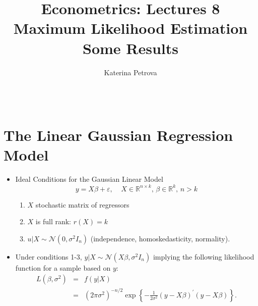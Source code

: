 \documentclass[notes=show]{beamer}
\begin{document}
\title{Econometrics: Lectures 8\\
Maximum Likelihood Estimation Some Results}
\author{Katerina Petrova \ \ \ \ \ \ \ \ \ \ \ \ \ \ \ \ \ \ \ \ \ \ \ \ \ \
\ \ \ \ \ \ \ \ \ \ \ \ \ \ \ \ \ \ \ \ \ \ \ \ \ \ \ \ \ \ \ \ \ \ \ \ \ \
\ \ \ \ \ \ \ \ \ \ \ \ \ \ \ \ \ \ \ \ \ \ \ }
\date{}
\maketitle

\section{The Linear Gaussian Regression Model}

\begin{frame}%



\begin{itemize}
\item Ideal Conditions for the Gaussian Linear Model%
\begin{equation*}
y=X\beta +\varepsilon ,\;\;\;\;X\in \mathbb{R}^{n\times k}\text{, }\beta \in 
\mathbb{R}^{k}\text{, }n>k
\end{equation*}

\begin{enumerate}
\item $X$ stochastic matrix of regressors

\item $X$ is full rank: $r\left( X\right) =k$

\item $u|X\sim \mathcal{N}\left( 0,\sigma ^{2}I_{n}\right) $ (independence,
homoskedasticity, normality).
\end{enumerate}

\item Under conditions 1-3, $y|X\sim \mathcal{N}\left( X\beta ,\sigma
^{2}I_{n}\right) $ implying the following likelihood function for a sample
based on $y$:%
\begin{eqnarray*}
L\left( \beta ,\sigma ^{2}\right) &=&f\left( y|X\right) \\
&=&\left( 2\pi \sigma ^{2}\right) ^{-n/2}\exp \left\{ -\frac{1}{2\sigma ^{2}}%
\left( y-X\beta \right) ^{\prime }\left( y-X\beta \right) \right\} .
\end{eqnarray*}
\end{itemize}

\end{frame}%
\end{document}

